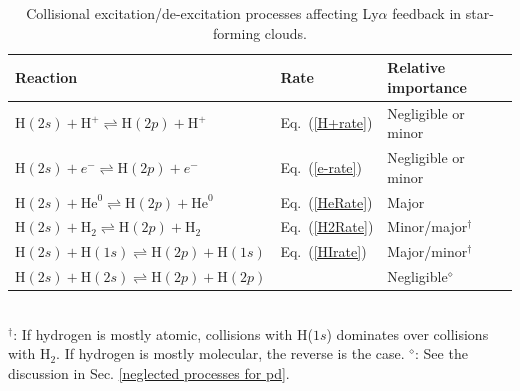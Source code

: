 \documentclass[fleqn,usenatbib]{mnras}
\begin{document}
\begin{table}
\caption{Collisional excitation/de-excitation processes affecting Ly$\alpha$ feedback in star-forming clouds.}
\begin{tabular}{l l l}
\hline
\hline
Reaction & Rate & Relative importance \\

\hline
\hline

\vspace{3 pt}

$\text{H}(2s) + \text{H}^{+} \rightleftharpoons \text{H}(2p) + \text{H}^{+}$ & Eq.~(\ref{H+rate}) & Negligible or minor \\

\vspace{3 pt}

$\text{H}(2s) + e^{-} \rightleftharpoons \text{H}(2p) + e^{-}$ & Eq.~(\ref{e-rate}) & Negligible or minor  \\

\vspace{3 pt}

$\text{H}(2s) + \text{He}^0 \rightleftharpoons \text{H}(2p) + \text{He}^0$ & Eq.~(\ref{HeRate}) & Major  \\

\vspace{3 pt}

$\text{H}(2s) + \text{H}_2 \rightleftharpoons \text{H}(2p) + \text{H}_2$ & Eq.~(\ref{H2Rate}) & Minor/major$^\dagger$ \\

\vspace{3 pt}

$\text{H}(2s) + \text{H}(1s) \rightleftharpoons \text{H}(2p) + \text{H}(1s)$ & Eq.~(\ref{HIrate}) & Major/minor$^\dagger$ \\

\vspace{3 pt}

$\text{H}(2s) + \text{H}(2s) \rightleftharpoons \text{H}(2p) + \text{H}(2p)$ &  & Negligible$^{\diamond}$  \\

\hline
\hline
\end{tabular}
\vspace{1 pt}\\
$^\dagger$: If hydrogen is mostly atomic, collisions with H($1s$) dominates over collisions with H$_2$. If hydrogen is mostly molecular, the reverse is the case.
$^{\diamond}$: See the discussion in Sec. \ref{neglected processes for pd}.
\label{CEtable}
\end{table}
\end{document}
